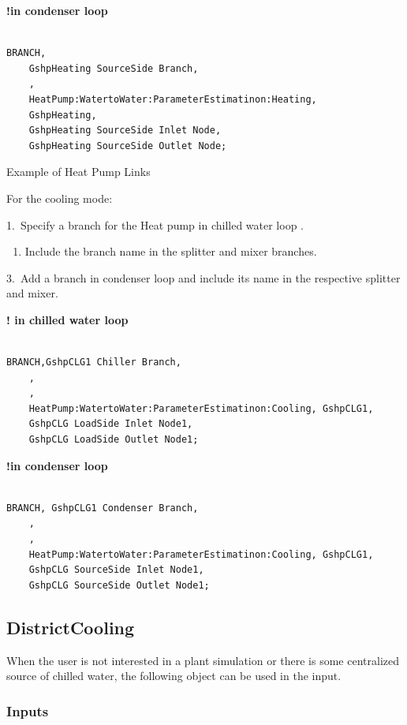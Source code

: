 \textbf{!in condenser loop}

\begin{lstlisting}

BRANCH,
	GshpHeating SourceSide Branch,
    ,
    HeatPump:WatertoWater:ParameterEstimatinon:Heating,
    GshpHeating,
    GshpHeating SourceSide Inlet Node,
    GshpHeating SourceSide Outlet Node;
\end{lstlisting}

Example of Heat Pump Links

For the cooling mode:

1.~Specify a branch for the Heat pump in chilled water loop .

\begin{enumerate}
    \def\labelenumi{\arabic{enumi}.}
    \setcounter{enumi}{1}
    \tightlist
    \item
    Include the branch name in the splitter and mixer branches.
\end{enumerate}

3.~Add a branch in condenser loop and include its name in the respective splitter and mixer.

\textbf{! in chilled water loop}

\begin{lstlisting}

BRANCH,GshpCLG1 Chiller Branch,
    ,
    ,
    HeatPump:WatertoWater:ParameterEstimatinon:Cooling, GshpCLG1,
    GshpCLG LoadSide Inlet Node1,
    GshpCLG LoadSide Outlet Node1;
\end{lstlisting}

\textbf{!in condenser loop}

\begin{lstlisting}

BRANCH, GshpCLG1 Condenser Branch,
    ,
    ,
    HeatPump:WatertoWater:ParameterEstimatinon:Cooling, GshpCLG1,
    GshpCLG SourceSide Inlet Node1,
    GshpCLG SourceSide Outlet Node1;
\end{lstlisting}

\subsection{DistrictCooling}\label{districtcooling}

When the user is not interested in a plant simulation or there is some centralized source of chilled water, the following object can be used in the input.

\subsubsection{Inputs}\label{inputs-16-008}

